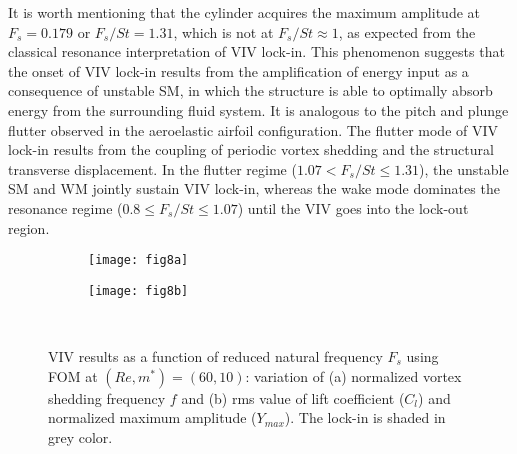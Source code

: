 \documentclass{jfm}
\begin{document}
It is worth mentioning that the cylinder acquires the maximum amplitude
at $F_{s}=0.179$ or $F_s/St=1.31$, which is not at $F_s/St \approx 1$, as expected from 
the classical resonance interpretation of VIV lock-in. This phenomenon suggests that the 
onset of VIV lock-in results from the amplification of energy input as a consequence of unstable SM, 
in which the structure is able to optimally absorb energy from the surrounding fluid system. 
It is analogous to the pitch and plunge flutter observed in 
the aeroelastic airfoil configuration. 
The flutter mode of VIV lock-in results 
from the coupling of periodic vortex shedding and the structural transverse displacement. 
In the flutter regime ($1.07 < F_s/St \le 1.31$), 
the unstable SM and WM jointly sustain VIV lock-in, 
whereas the wake mode dominates the 
resonance regime ($0.8 \le F_s/St \le 1.07$) until the VIV goes into the lock-out region. 

\begin{figure}
\centering
\begin{subfigure}{0.495\textwidth}
\centering
	 \texttt{[image: fig8a]}
    \caption{}
    \label{fig:m10_re60_fs}
    \end{subfigure} 
\begin{subfigure}{0.495\textwidth} 
\centering
     \texttt{[image: fig8b]}
	\caption{}
	\label{fig:m10_re60_cly}
	\end{subfigure}	\\
     \caption{VIV results as a function of reduced natural frequency $F_s$
     using FOM at $(Re,m^*)=(60,10)$: variation of 
      (a) normalized vortex shedding frequency $f$ and 
      (b) rms value of lift coefficient ($C_l$) and normalized maximum amplitude ($Y_{max}$).
      The lock-in is shaded in grey color.}
     \label{fig:m10_re60_fom}
\end{figure}
\end{document}
